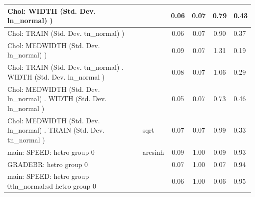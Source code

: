 \begin{table}
\begin{center}
\begin{tabular}{|l|l|c|c|c|l|}
			\hline
			 Chol: WIDTH (Std. Dev. ln_normal) ) &  & 0.06 & 0.07 & 0.79 & 0.43 \\
			\hline
			 Chol: TRAIN (Std. Dev. tn_normal) ) &  & 0.06 & 0.07 & 0.90 & 0.37 \\
			\hline
			 Chol: MEDWIDTH (Std. Dev. ln_normal) ) &  & 0.09 & 0.07 & 1.31 & 0.19 \\
			\hline
			 Chol: TRAIN (Std. Dev. tn_normal) . WIDTH (Std. Dev.   ln_normal ) &  & 0.08 & 0.07 & 1.06 & 0.29 \\
			\hline
			 Chol: MEDWIDTH (Std. Dev. ln_normal) . WIDTH (Std. Dev.   ln_normal ) &  & 0.05 & 0.07 & 0.73 & 0.46 \\
			\hline
			 Chol: MEDWIDTH (Std. Dev. ln_normal) . TRAIN (Std. Dev.   tn_normal ) & sqrt & 0.07 & 0.07 & 0.99 & 0.33 \\
			\hline
			main: SPEED: hetro group 0 & arcsinh & 0.09 & 1.00 & 0.09 & 0.93 \\
			\hline
			GRADEBR: hetro group 0 &  & 0.07 & 1.00 & 0.07 & 0.94 \\
			\hline
			main: SPEED: hetro group 0:ln_normal:sd  hetro group 0 &  & 0.06 & 1.00 & 0.06 & 0.95 \\
			\hline
		\end{tabular}
	\end{center}
\end{table}